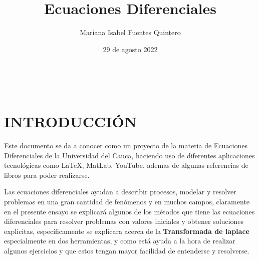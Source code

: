 \documentclass[12pt,a4paper]{article}
\begin{document}
\begin{titlepage}

\vspace{1.5cm}
\author{Mariana Isabel Fuentes Quintero}
\bf\title{Ecuaciones Diferenciales}
\date{29 de agosto 2022}
\maketitle
\thispagestyle{empty}
\vspace{1cm}


\vspace{1.3cm}


\centering{}

\vspace{2.5cm}
\centering{}


\vspace{5cm}

\centering\fontsize{15}{0}{\selectfont{Programa de Ingeniería Civil}}\\
\centering\fontsize{18}{0}{\selectfont{Universidad del Cauca}}

\end{titlepage}

\newpage

\section{INTRODUCCIÓN}
Este documento se da a conocer como un proyecto de la materia de Ecuaciones Diferenciales de la Universidad del Cauca, haciendo uso de diferentes aplicaciones tecnológicas como LaTeX, MatLab, YouTube, ademas de algunas referencias de libros para poder realizarse.

Las ecuaciones diferenciales ayudan a describir procesos, modelar y resolver problemas en una gran cantidad de fenómenos y en muchos campos, claramente en el presente ensayo se explicará algunos de los métodos que tiene las ecuaciones diferenciales para resolver problemas con valores iniciales y obtener soluciones explicitas, específicamente se explicara acerca de la \textbf{Transformada de laplace} especialmente en dos herramientas, y como está ayuda a la hora de realizar algunos ejercicios y que estos tengan mayor facilidad de entenderse y resolverse.
\end{document}
